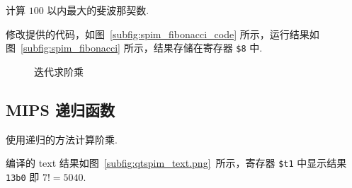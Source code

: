 \documentclass[11pt]{SEU-Digital-Report}
\begin{document}
        计算 $100$ 以内最大的斐波那契数.

        修改提供的代码，如图~\ref{subfig:spim_fibonacci_code} 所示，运行结果如图~\ref{subfig:spim_fibonacci} 所示，结果存储在寄存器 \texttt{\$8} 中.

        \newpage

        \begin{figure}[htbp]
          \centering
          \caption{迭代求阶乘}
          \label{fig:spim_fibonacci}
        \end{figure}

    \subsection{MIPS 递归函数}

      使用递归的方法计算阶乘.

      编译的 text 结果如图~\ref{subfig:qtspim_text.png}~所示，寄存器 \texttt{\$t1} 中显示结果 \texttt{13b0} 即 $7!=5040$.
\end{document}
